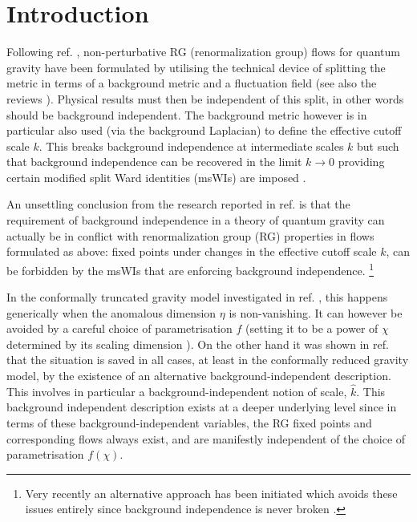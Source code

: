 \documentclass[11pt]{book} %
\numberwithin{equation}{chapter}
\begin{document}
\section{Introduction}
\label{sec:introduction}

Following ref. \cite{Reuter:1996cp},
non-perturbative RG (renormalization group) flows for quantum gravity have been formulated
by utilising the technical device of splitting the metric in terms of a background metric
and a fluctuation field (see also the reviews
\cite{Reuter:2012id, Percacci:2011fr, Niedermaier:2006wt, Nagy:2012ef, Litim:2011cp}).
Physical results must then be independent of this split, in other words should be background independent.
The background metric however is in particular also used (via the background Laplacian)
to define the effective cutoff scale $k$.
This breaks background independence at intermediate scales $k$ but such that background
independence can be recovered in the limit $k\to0$ providing certain modified split Ward
identities (msWIs) are imposed
\cite{Pawlowski:2005xe, Litim:2002hj, Bridle:2013sra, Reuter:1997gx, Litim:1998nf, Litim:2002ce,
Manrique:2009uh, Manrique:2010mq, Manrique:2010am, Dietz:2015owa, Safari:2015dva}.

An unsettling conclusion from the research reported in ref. \cite{Dietz:2015owa} is that the
requirement of background independence in a theory of quantum gravity can actually be
in conflict with renormalization group (RG) properties in flows formulated as above:
fixed points under changes in the effective cutoff scale $k$, can be forbidden by the msWIs
that are enforcing background independence.%
\footnote{Very recently an alternative approach has been initiated which avoids
these issues entirely since background independence is never broken \cite{Morris:2016nda}.}

In the conformally truncated gravity model investigated in ref. \cite{Dietz:2015owa},
this happens generically when the anomalous dimension $\eta$ is non-vanishing.
It can however be avoided by a careful choice of parametrisation $f$
(setting it to be a power of $\chi$ determined by its scaling dimension \cite{Dietz:2015owa}).
On the other hand it was shown in ref. \cite{Dietz:2015owa} that the situation is saved in all cases,
at least in the conformally reduced gravity model,
by the existence of an alternative background-independent description.
This involves in particular a background-independent notion of scale, $\hat{k}$.
This background independent description exists at a deeper underlying level since in terms
of these background-independent variables, the RG fixed points and corresponding flows always exist,
and are manifestly independent of the choice of parametrisation $f(\chi)$.
\end{document}
